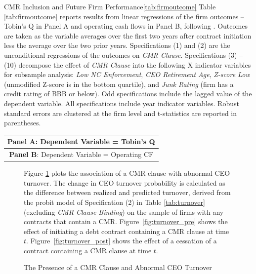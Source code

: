 \documentclass[a4paper,12pt]{article}
\begin{document}
\begin{singlespace}
\begin{landscapepapertable}{CMR Inclusion and Future Firm Performance}{\ref{tab:firmoutcome}}{\skipline}
    Table \ref{tab:firmoutcome} reports results from linear regressions of the firm outcomes -- Tobin's Q in Panel A and operating cash flows in Panel B, following \cite{Nini_2009}.
    Outcomes are taken as the variable averages over the first two years after contract initiation less the average over the two prior years.
    Specifications (1) and (2) are the unconditional regressions of the outcomes on \textit{CMR Clause}.
    Specifications (3) -- (10) decompose the effect of \textit{CMR Clause} into the following X indicator variables for subsample analysis: \textit{Low NC Enforcement}, \textit{CEO Retirement Age}, \textit{Z-score Low} (unmodified Z-score is in the bottom quartile), and \textit{Junk Rating} (firm has a credit rating of BBB or below).
    Odd specifications include the lagged value of the dependent variable.
    All specifications include year indicator variables.
    Robust standard errors are clustered at the firm level and t-statistics are reported in parentheses.
    \postamble
    
    \setlength\tabcolsep{4pt}
    \startdata
    \begin{tabular}{l*{10}{c}}
        \toprule
        \multicolumn{11}{c}{\small  \textbf{Panel A}: Dependent Variable = Tobin's Q} \\
        \midrule
        
        \midrule \midrule
        \multicolumn{11}{c}{\small  \textbf{Panel B}: Dependent Variable = Operating CF} \\
        \midrule
        
        \bottomrule
    \end{tabular}
\end{landscapepapertable}



\clearpage
\bgroup
\begin{figure}[ht]
    \caption{The Presence of a CMR Clause and Abnormal CEO Turnover} \label{fig:turnover}
 	\footnotesize

     Figure \ref{fig:turnover} plots the association of a CMR clause with abnormal CEO turnover.
     The change in CEO turnover probability is calculated as the difference between realized and predicted turnover, derived from the probit model of Specification (2) in Table \ref{tab:turnover} (excluding \textit{CMR Clause Binding}) on the sample of firms with any contracts that contain a CMR.
     Figure~\ref{fig:turnover_pre} shows the effect of initiating a debt contract containing a CMR clause at time $t$.
     Figure~\ref{fig:turnover_post} shows the effect of a cessation of a contract containing a CMR clause at time $t$.


\end{figure}
\end{singlespace}
\end{document}
